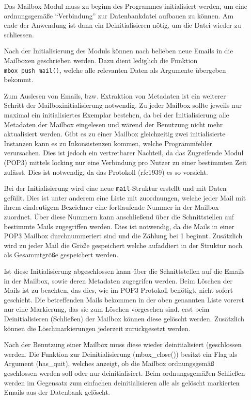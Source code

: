 \documentclass[final,a4paper,11pt,notitlepage,halfparskip]{scrreprt}
\begin{document}
Das Mailbox Modul muss zu beginn des Programmes initialisiert werden, um eine
ordnungsgemäße "`Verbindung"' zur Datenbankdatei aufbauen zu können. Am ende der
Anwendung ist dann ein Deinitialisieren nötig, um die Datei wieder zu
schliessen.

Nach der Initialisierung des Moduls können nach belieben neue Emails in die
Mailboxen geschrieben werden. Dazu dient lediglich die Funktion
\texttt{mbox\_push\_mail()}, welche alle relevanten Daten als Argumente
übergeben bekommt.

Zum Auslesen von Emails, bzw. Extraktion von Metadaten ist ein weiterer Schritt
der Mailboxinitialisierung notwendig. Zu jeder Mailbox sollte jeweils nur
maximal ein initialisiertes Exemplar bestehen, da bei der Initialisierung alle
Metadaten der Mailbox eingelesen und wärend der Benutzung nicht mehr
aktualisiert werden. Gibt es zu einer Mailbox gleichzeitig zwei initialisierte
Instanzen kann es zu Inkonsistenzen kommen, welche Programmfehler verursachen.
Dies ist jedoch ein vertretbarer Nachteil, da das Zugreifende Modul (POP3)
mittels locking nur eine Verbindung pro Nutzer zu einer bestimmten Zeit zulässt.
Dies ist notwendig, da das Protokoll (rfc1939) es so vorsieht.

Bei der Initialisierung wird eine neue \texttt{mail}-Struktur erstellt und mit
Daten gefüllt. Dies ist unter anderem eine Liste mit zuordnungen, welche jeder
Mail mit ihrem eindeutigem Bezeichner eine fortlaufende Nummer in der Mailbox
zuordnet. Über diese Nummern kann anschließend über die Schnittstellen auf
bestimmte Mails zugegriffen werden. Dies ist notwendig, da die Mails in einer
POP3 Mailbox durchnummeriert sind und die Zählung bei 1 beginnt. Zusätzlich wird
zu jeder Mail die Größe gespeichert welche aufaddiert in der Struktur noch als
Gesammtgröße gespeichert werden.

Ist diese Initialisierung abgeschlossen kann über die Schnittstellen auf die
Emails in der Mailbox, sowie deren Metadaten zugegrifen werden. Beim Löschen der
Mails ist zu beachten, das dies, wie im POP3 Protokoll benötigt, nicht sofort
geschieht. Die betreffenden Mails bekommen in der oben genannten Liste vorerst
nur eine Markierung, das sie zum Löschen vorgesehen sind. erst beim
Deinitialisieren (Schließen) der Mailbox können diese gelöscht werden.
Zusätzlich können die Löschmarkierungen jederzeit zurückgesetzt werden.

Nach der Benutzung einer Mailbox muss diese wieder deinitialisiert (geschlossen
werden. Die Funktion zur Deinitialisierung (mbox\_close()) besitzt ein Flag als
Argument (has\_quit), welches anzeigt, ob die Mailbox ordnungsgemäß geschlossen
werden soll oder nur deinitialisiert. Beim ordnungsgemäßen Schließen werden im
Gegensatz zum einfachen deinitialisieren alle als gelöscht markierten Emails 
aus der Datenbank gelöscht.
\end{document}
